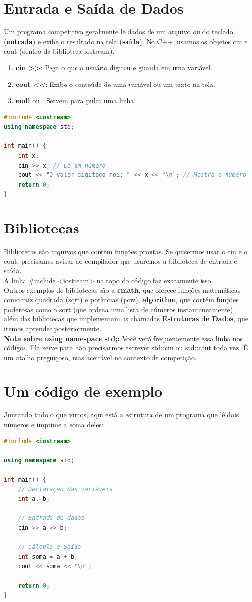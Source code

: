 \documentclass[12pt]{article}
\begin{document}
\section{Entrada e Saída de Dados}
Um programa competitivo geralmente lê dados de um arquivo ou do teclado (\textbf{entrada}) e exibe o resultado na tela (\textbf{saída}). No C++, usamos os objetos cin e cout (dentro da biblioteca iostream).

\begin{enumerate}
    \item \textbf{cin >>}: Pega o que o usuário digitou e guarda em uma variável.
    \item \textbf{cout <<}: Exibe o conteúdo de uma variável ou um texto na tela.
    \item \textbf{endl} ou \textbf{}: Servem para pular uma linha. 
\end{enumerate}

\begin{lstlisting}[language=C++]
#include <iostream>
using namespace std;

int main() {
    int x;
    cin >> x; // Lê um número
    cout << "O valor digitado foi: " << x << "\n"; // Mostra o número
    return 0; 
}
\end{lstlisting}

\section{Bibliotecas}
Bibliotecas são arquivos que contêm funções prontas. Se quisermos usar o cin e o cout, precisamos avisar ao compilador que usaremos a biblioteca de entrada e saída.\\
A linha \#include <iostream> no topo do código faz exatamente isso.\\
Outros exemplos de bibliotecas são a \textbf{cmath}, que oferece funções matemáticas como raiz quadrada (sqrt) e potências (pow), \textbf{algorithm}, que contém funções poderosas como o sort (que ordena uma lista de números instantaneamente), além das bibliotecas que implementam as chamadas \textbf{Estruturas de Dados}, que iremos aprender posteriormente. \\
\textbf{Nota sobre using namespace std;:} Você verá frequentemente essa linha nos códigos. Ela serve para não precisarmos escrever std::cin ou std::cout toda vez. É um atalho preguiçoso, mas aceitável no contexto de competição.

\section{Um código de exemplo}
Juntando tudo o que vimos, aqui está a estrutura de um programa que lê dois números e imprime a soma deles:

\begin{lstlisting}[language=C++]
#include <iostream>

using namespace std;

int main() {
    // Declaração das variáveis
    int a, b;

    // Entrada de dados
    cin >> a >> b;
    
    // Cálculo e Saída
    int soma = a + b;
    cout << soma << "\n";

    return 0;
}
\end{lstlisting}
\end{document}
